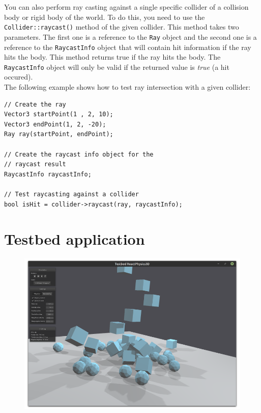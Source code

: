\documentclass[a4paper,12pt]{article}
\begin{document}
    You can also perform ray casting against a single specific collider of a collision body or rigid body of the world. To do this, you need to use the
    \texttt{Collider::raycast()} method of the given collider. This method takes two parameters. The first one is a reference to the \texttt{Ray}
    object and the second one is a reference to the \texttt{RaycastInfo} object that will contain hit information if the ray hits the body. This method returns
    true if the ray hits the body. The \texttt{RaycastInfo} object will only be valid if the returned value is \emph{true} (a hit occured). \\

    The following example shows how to test ray intersection with a given collider: \\

    \begin{lstlisting}
// Create the ray
Vector3 startPoint(1 , 2, 10);
Vector3 endPoint(1, 2, -20);
Ray ray(startPoint, endPoint);

// Create the raycast info object for the
// raycast result
RaycastInfo raycastInfo;

// Test raycasting against a collider
bool isHit = collider->raycast(ray, raycastInfo);
    \end{lstlisting}

    \vspace{0.6cm}

    \section{Testbed application}
    \label{sec:testbed}

    \begin{figure}[!ht]
        \centering
	  \includegraphics[scale=0.5]{testbed.png}
        \label{fig:testbed}
    \end{figure}
\end{document}
